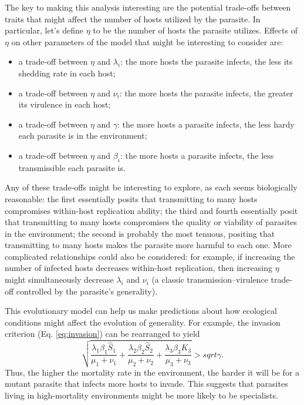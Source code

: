 \documentclass[11pt,reqno,final,pdftex]{amsart}\usepackage[]{graphicx}\usepackage[]{color}
\theoremstyle{plain}
\numberwithin{equation}{part}
\begin{document}
The key to making this analysis interesting are the potential trade-offs between traits that might affect the number of hosts utilized by the parasite.
In particular, let's define $\eta$ to be the number of hosts the parasite utilizes.
Effects of $\eta$ on other parameters of the model that might be interesting to consider are:
\begin{itemize}
\item a trade-off between $\eta$ and $\lambda_i$: the more hosts the parasite infects, the less its shedding rate in each host;
\item a trade-off between $\eta$ and $\nu_i$: the more hosts the parasite infects, the greater its virulence in each host;
\item a trade-off between $\eta$ and $\gamma$: the more hosts a parasite infects, the less hardy each parasite is in the environment;
\item a trade-off between $\eta$ and $\beta_i$: the more hosts a parasite infects, the less transmissible each parasite is.
\end{itemize}
Any of these trade-offs might be interesting to explore, as each seems biologically reasonable: the first essentially posits that transmitting to many hosts compromises within-host replication ability; the third and fourth essentially posit that transmitting to many hosts compromises the quality or viability of parasites in the environment; the second is probably the most tenuous, positing that transmitting to many hosts makes the parasite more harmful to each one.
More complicated relationships could also be considered: for example, if increasing the number of infected hosts decreases within-host replication, then increasing $\eta$ might simultaneously decrease $\lambda_i$ and $\nu_i$ (a classic transmission--virulence trade-off controlled by the parasite's generality).

This evolutionary model can help us make predictions about how ecological conditions might affect the evolution of generality.
For example, the invasion criterion (Eq. \ref{eq:invasion}) can be rearranged to yield
\begin{equation}
\sqrt{\frac{\lambda_1 \beta_1 \hat{S}_1}{\mu_1 + \nu_1} + \frac{\lambda_2 \beta_2 \hat{S}_2}{\mu_2 + \nu_2} + \frac{\lambda_3 \beta_3 K_3}{\mu_3 + \nu_3}} > sqrt{\gamma}.
\end{equation}
Thus, the higher the mortality rate in the environment, the harder it will be for a mutant parasite that infects more hosts to invade.
This suggests that parasites living in high-mortality environments might be more likely to be specialists.
\end{document}
